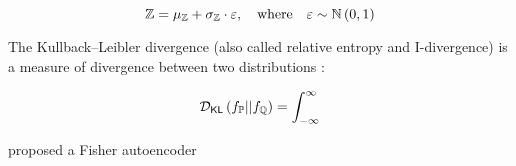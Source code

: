 \begin{equation}
 \mathbb{Z} = {\mu_{\mathbb{Z}}} + {\sigma_{\mathbb{Z}}} \cdot \varepsilon, \quad \mbox{where} \quad \varepsilon \sim \mathbb{N}\left(0,1\right)
\end{equation}

The Kullback–Leibler divergence (also called relative entropy and I-divergence) is a measure of divergence between two distributions \citep{KLD1951,csiszar1975}:

\begin{equation}
 \mathcal{D}_{\mathsf{KL}}\left(f_{\mathbb{P}} || f_{\mathbb{Q}} \right) = \displaystyle\int_{-\infty}^{\infty}
\end{equation}

\cite{Zheng2019} proposed a Fisher autoencoder
